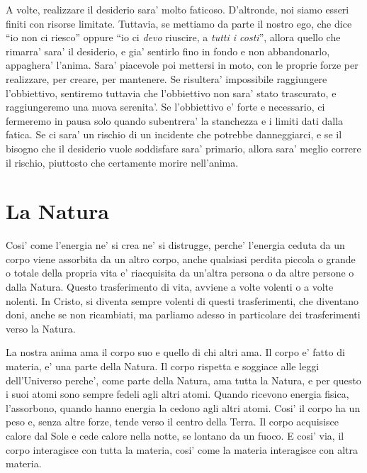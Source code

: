 A volte, realizzare il desiderio sara' molto faticoso. D'altronde, noi siamo esseri finiti con risorse limitate. Tuttavia, se mettiamo da parte il nostro ego, che dice ``io non ci riesco'' oppure ``io ci \emph{devo} riuscire, a \emph{tutti i costi}'', allora quello che rimarra' sara' il desiderio, e gia' sentirlo fino in fondo e non abbandonarlo, appaghera' l'anima. Sara' piacevole poi mettersi in moto, con le proprie forze per realizzare, per creare, per mantenere. Se risultera' impossibile raggiungere l'obbiettivo, sentiremo tuttavia che l'obbiettivo non sara' stato trascurato, e raggiungeremo una nuova serenita'. Se l'obbiettivo e' forte e necessario, ci fermeremo in pausa solo quando subentrera' la stanchezza e i limiti dati dalla fatica. Se ci sara' un rischio di un incidente che potrebbe danneggiarci, e se il bisogno che il desiderio vuole soddisfare sara' primario, allora sara' meglio correre il rischio, piuttosto che certamente morire nell'anima.


\section{La Natura}

Cosi' come l'energia ne' si crea ne' si distrugge, perche' l'energia ceduta da un corpo viene assorbita da un altro corpo, anche qualsiasi perdita piccola o grande o totale della propria vita e' riacquisita da un'altra persona o da altre persone o dalla Natura. Questo trasferimento di vita, avviene a volte volenti o a volte nolenti. In Cristo, si diventa sempre volenti di questi trasferimenti, che diventano doni, anche se non ricambiati, ma parliamo adesso in particolare dei trasferimenti verso la Natura. 

La nostra anima ama il corpo suo e quello di chi altri ama. Il corpo e' fatto di materia, e' una parte della Natura. Il corpo rispetta e soggiace alle leggi dell'Universo perche', come parte della Natura, ama tutta la Natura, e per questo i suoi atomi sono sempre fedeli agli altri atomi. Quando ricevono energia fisica, l'assorbono, quando hanno energia la cedono agli altri atomi.
Cosi' il corpo ha un peso e, senza altre forze, tende verso il centro della Terra. Il corpo acquisisce calore dal Sole e cede calore nella notte, se lontano da un fuoco. E cosi' via, il corpo interagisce con tutta la materia, cosi' come la materia interagisce con altra materia.

